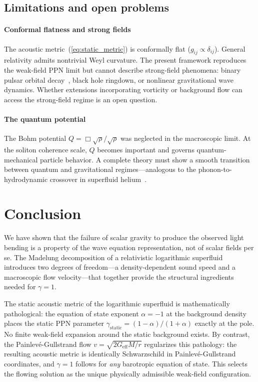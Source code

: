 \documentclass[12pt, a4paper]{article}
\begin{document}
\subsection{Limitations and open problems}

\paragraph{Conformal flatness and strong fields}
The acoustic metric~(\ref{eq:static_metric}) is
conformally flat ($g_{ij} \propto \delta_{ij}$).
General relativity admits nontrivial Weyl curvature. The present framework reproduces the weak-field PPN limit but cannot describe strong-field phenomena: binary pulsar orbital decay~\cite{taylor_1979}, black hole ringdown, or nonlinear gravitational wave dynamics. Whether extensions incorporating vorticity or background flow can access the strong-field regime is an open question.

\newpage
\paragraph{The quantum potential}
The Bohm potential $Q = \Box\sqrt{\rho}/\sqrt{\rho}$ was neglected in the macroscopic limit. At the soliton coherence scale, $Q$ becomes important and governs quantum-mechanical particle behavior. A complete theory must show a smooth transition between quantum and gravitational regimes---analogous to the phonon-to-hydrodynamic crossover in superfluid helium~\cite{volovik_2003}.

\section{Conclusion}
\label{sec:conclusion}

We have shown that the failure of scalar gravity to produce the observed light bending is a property of the wave equation representation, not of scalar fields per se. The Madelung decomposition of a relativistic logarithmic superfluid introduces two degrees of freedom---a density-dependent sound speed and a macroscopic flow velocity---that together provide the structural ingredients needed for $\gamma = 1$.

The static acoustic metric of the logarithmic superfluid is mathematically pathological: the equation of state exponent $\alpha = -1$ at the background density places the static PPN parameter $\gamma_{\mathrm{static}} = (1-\alpha)/(1+\alpha)$ exactly at the pole. No finite weak-field expansion around the static background exists. By contrast, the Painlev\'{e}-Gullstrand flow $v = \sqrt{2G_{\mathrm{eff}}M/r}$ regularizes this pathology: the resulting acoustic metric is identically Schwarzschild in Painlev\'{e}-Gullstrand coordinates, and $\gamma = 1$ follows for \emph{any} barotropic equation of state. This selects the flowing solution as the unique physically admissible weak-field configuration.
\end{document}
